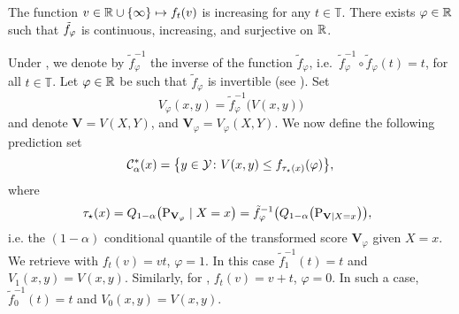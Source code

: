   \begin{assumption}
  \label{ass:tau}
    The function $v\in\mathbb{R} \cup\{\infty\}\mapsto f_{t}(v)$ is increasing for any $t\in\mathbb{T}$.
    There exists $\varphi\in\mathbb{R}$ such that $\tilde{f}_{\varphi}$ is continuous, increasing, and surjective on $\mathbb{R}$.
  \end{assumption}
  Under , we denote by $\tilde{f}_\varphi^{-1}$ the inverse of the function $\tilde{f}_\varphi$, i.e.\ $\tilde{f}_\varphi^{-1} \circ \tilde{f}_\varphi(t)= t$, for all $t \in \mathbb{T}$. %
  Let \(\varphi \in \mathbb{R}\) be such that $\tilde{f}_\varphi$ is invertible (see ). Set 
  \begin{equation}
  \label{eq:def:V-varphi}
  V_\varphi(x,y) = \tilde{f}_\varphi^{-1}\bigl(V(x, y)\bigr)
  \end{equation}
  and denote $\mathbf{V} = V(X, Y)$, and $\mathbf{V}_\varphi = V_\varphi(X,Y)$. 
  We now define the following prediction set
  \begin{equation}
    \mathcal{C}_{\alpha}^*(x) = \bigl\{y \in \mathcal{Y}\colon V(x, y) \leq f_{\tau_\star(x)}(\varphi)\bigr\},
  \label{eq:rcp2}
  \end{equation}
  where 
  \begin{equation}
  \label{eq:definition-tau}
    \!\!\! \tau_\star(x) = Q_{1 - \alpha}\big(\textup{P}_{\mathbf{V}_\varphi} \mid X = x\big)
    = \tilde{f}_\varphi^{-1}\bigl(Q_{1 - \alpha}\bigl(\textup{P}_{\mathbf{V} \mid X = x}\bigr)\bigr),
  \end{equation}
  i.e. the \((1-\alpha)\) conditional quantile of the transformed score \(\mathbf{V}_\varphi\) given \(X = x\). We retrieve  with $f_t(v)= vt$, $\varphi=1$. In this case $\tilde{f}_1^{-1}(t)=t$ and $V_1(x,y)= V(x,y)$. Similarly, for , $f_t(v)= v+t$, $\varphi=0$. In such a case, $\tilde{f}_0^{-1}(t)=t$ and $V_0(x,y)= V(x,y)$.   
  
